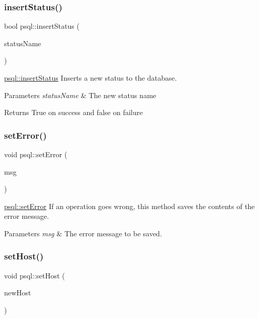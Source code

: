 \subsubsection{\texorpdfstring{insertStatus()}{insertStatus()}}
{\footnotesize\ttfamily bool psql\+::insert\+Status (\begin{DoxyParamCaption}\item[{Q\+String}]{status\+Name }\end{DoxyParamCaption})}



\mbox{\hyperlink{classpsql_a601ee0bdc9430b1d674a857f7c94b767}{psql\+::insert\+Status}} Inserts a new status to the database. 


\begin{DoxyParams}{Parameters}
{\em status\+Name} & The new status name \\
\hline
\end{DoxyParams}
\begin{DoxyReturn}{Returns}
True on success and false on failure 
\end{DoxyReturn}
\mbox{\label{classpsql_a9a0d5ba32aabe6018a36fb0bc185445b}} 
\subsubsection{\texorpdfstring{setError()}{setError()}}
{\footnotesize\ttfamily void psql\+::set\+Error (\begin{DoxyParamCaption}\item[{Q\+String}]{msg }\end{DoxyParamCaption})}



\mbox{\hyperlink{classpsql_a9a0d5ba32aabe6018a36fb0bc185445b}{psql\+::set\+Error}} If an operation goes wrong, this method saves the contents of the error message. 


\begin{DoxyParams}{Parameters}
{\em msg} & The error message to be saved. \\
\hline
\end{DoxyParams}
\mbox{\label{classpsql_a96b3b9483f1a642c026d4b5cf505eb75}} 
\subsubsection{\texorpdfstring{setHost()}{setHost()}}
{\footnotesize\ttfamily void psql\+::set\+Host (\begin{DoxyParamCaption}\item[{Q\+String}]{new\+Host }\end{DoxyParamCaption})}



